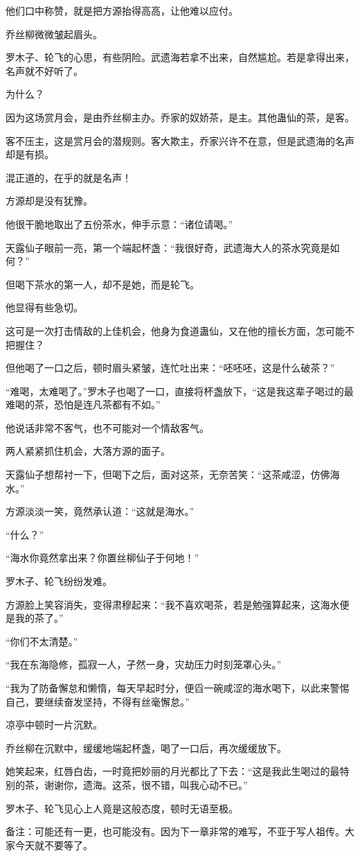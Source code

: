 \begin{this_body}
他们口中称赞，就是把方源抬得高高，让他难以应付。

乔丝柳微微皱起眉头。

罗木子、轮飞的心思，有些阴险。武遗海若拿不出来，自然尴尬。若是拿得出来，名声就不好听了。

为什么？

因为这场赏月会，是由乔丝柳主办。乔家的奴娇茶，是主。其他蛊仙的茶，是客。

客不压主，这是赏月会的潜规则。客大欺主，乔家兴许不在意，但是武遗海的名声却是有损。

混正道的，在乎的就是名声！

方源却是没有犹豫。

他很干脆地取出了五份茶水，伸手示意：“诸位请喝。”

天露仙子眼前一亮，第一个端起杯盏：“我很好奇，武遗海大人的茶水究竟是如何？”

但喝下茶水的第一人，却不是她，而是轮飞。

他显得有些急切。

这可是一次打击情敌的上佳机会，他身为食道蛊仙，又在他的擅长方面，怎可能不把握住？

但他喝了一口之后，顿时眉头紧皱，连忙吐出来：“呸呸呸，这是什么破茶？”

“难喝，太难喝了。”罗木子也喝了一口，直接将杯盏放下，“这是我这辈子喝过的最难喝的茶，恐怕是连凡茶都有不如。”

他说话非常不客气，也不可能对一个情敌客气。

两人紧紧抓住机会，大落方源的面子。

天露仙子想帮衬一下，但喝下之后，面对这茶，无奈苦笑：“这茶咸涩，仿佛海水。”

方源淡淡一笑，竟然承认道：“这就是海水。”

“什么？”

“海水你竟然拿出来？你置丝柳仙子于何地！”

罗木子、轮飞纷纷发难。

方源脸上笑容消失，变得肃穆起来：“我不喜欢喝茶，若是勉强算起来，这海水便是我的茶了。”

“你们不太清楚。”

“我在东海隐修，孤寂一人，孑然一身，灾劫压力时刻笼罩心头。”

“我为了防备懈怠和懒惰，每天早起时分，便舀一碗咸涩的海水喝下，以此来警惕自己，要继续奋发坚持，不得有丝毫懈怠。”

凉亭中顿时一片沉默。

乔丝柳在沉默中，缓缓地端起杯盏，喝了一口后，再次缓缓放下。

她笑起来，红唇白齿，一时竟把妙丽的月光都比了下去：“这是我此生喝过的最特别的茶，谢谢你，遗海。这茶，很不错，叫我心动不已。”

罗木子、轮飞见心上人竟是这般态度，顿时无语至极。

备注：可能还有一更，也可能没有。因为下一章非常的难写，不亚于写人祖传。大家今天就不要等了。

\end{this_body}

